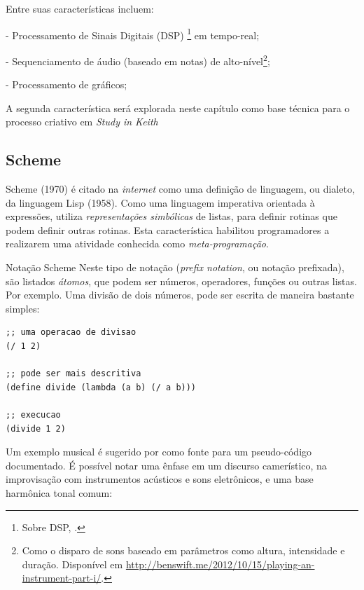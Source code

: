 Entre suas características incluem:

- Processamento de Sinais Digitais (DSP) \footnote{Sobre DSP, .} em  tempo-real;

- Sequenciamento de áudio (baseado em notas) de alto-nível\footnote{Como o disparo de sons baseado em parâmetros como altura, intensidade e duração. Disponível em \url{http://benswift.me/2012/10/15/playing-an-instrument-part-i/}.};

- Processamento de gráficos;


A segunda característica será explorada neste capítulo como base técnica para o processo criativo em \emph{Study in Keith}

\subsection{Scheme}\label{sec:scheme}

Scheme (1970) é citado na \emph{internet} como uma definição de linguagem, ou dialeto, da linguagem Lisp (1958). Como uma linguagem imperativa orientada à expressões, utiliza \emph{representações simbólicas} de listas, para definir rotinas que podem definir outras rotinas. Esta característica habilitou programadores a realizarem uma atividade conhecida como \emph{meta-programação}.

\begin{example}{Notação Scheme}
Neste tipo de notação (\emph{prefix notation}, ou notação prefixada), são listados \emph{átomos}, que podem ser números, operadores, funções ou outras listas. Por exemplo. Uma divisão de dois números, pode ser escrita de maneira bastante simples:

\begin{verbatim}
;; uma operacao de divisao
(/ 1 2)

;; pode ser mais descritiva
(define divide (lambda (a b) (/ a b)))

;; execucao
(divide 1 2)
\end{verbatim}
\end{example}

Um exemplo musical é sugerido por  como fonte para um pseudo-código documentado. É possível notar uma ênfase em um discurso camerístico, na improvisação com instrumentos acústicos e sons eletrônicos, e uma base harmônica tonal comum:

